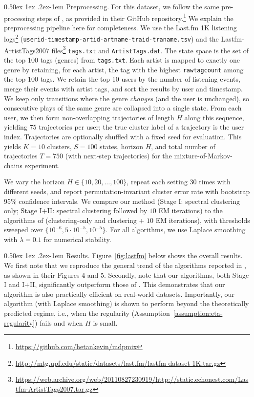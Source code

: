 \documentclass[twoside]{article}
\makeatletter
\renewcommand{\paragraph}{%
  \@startsection{paragraph}{4}%
  {\z@}{0.50ex \@plus 1ex \@minus .2ex}{-1em}%
  {\normalfont\normalsize\bfseries}%
}
\theoremstyle{plain}
\makeatother
\begin{document}
\paragraph{Preprocessing.}
For this dataset, we follow the same pre-processing steps of \citet{kausik2023mixture}, as provided in their GitHub repository.\footnote{\url{https://github.com/hetankevin/mdpmix}}
We explain the preprocessing pipeline here for completeness.
We use the Last.fm 1K listening logs\footnote{\url{http://mtg.upf.edu/static/datasets/last.fm/lastfm-dataset-1K.tar.gz}} (\texttt{userid-timestamp-artid-artname-traid-traname.tsv}) and the Lastfm-ArtistTags2007 files\footnote{\url{https://web.archive.org/web/20110827230919/http://static.echonest.com/Lastfm-ArtistTags2007.tar.gz}} \texttt{tags.txt} and \texttt{ArtistTags.dat}.
The state space is the set of the top 100 tags (genres) from \texttt{tags.txt}. 
Each artist is mapped to exactly one genre by retaining, for each artist, the tag with the highest \texttt{rawtagcount} among the top 100 tags.
We retain the top 10 users by the number of listening events, merge their events with artist tags, and sort the results by user and timestamp.
We keep only transitions where the genre \emph{changes} (and the user is unchanged), so consecutive plays of the same genre are collapsed into a single state.
From each user, we then form non-overlapping trajectories of length $H$ along this sequence, yielding $75$ trajectories per user; the true cluster label of a trajectory is the user index.
Trajectories are optionally shuffled with a fixed seed for evaluation.
This yields $K = 10$ clusters, $S = 100$ states, horizon $H$, and total number of trajectories $T = 750$ (with next-step trajectories) for the mixture-of-Markov-chains experiment.

We vary the horizon $H \in \{10, 20, \ldots, 100\}$, repeat each setting 30 times with different seeds, and report permutation-invariant cluster error rate with bootstrap 95\% confidence intervals.
We compare our method (Stage I: spectral clustering only; Stage I+II: spectral clustering followed by $10$ EM iterations) to the algorithms of \citet{kausik2023mixture} (clustering-only and clustering + $10$ EM iterations), with thresholds sweeped over $\{10^{-6}, 5 \cdot 10^{-5}, 10^{-5}\}$.
For all algorithms, we use Laplace smoothing with $\lambda = 0.1$ for numerical stability.

\paragraph{Results.}
Figure~\ref{fig:lastfm} below shows the overall results.
We first note that we reproduce the general trend of the algorithms reported in \citet{kausik2023mixture}, as shown in their Figures 4 and 5.
Secondly, note that our algorithms, both Stage I and I+II, significantly outperform those of \citet{kausik2023mixture}.
This demonstrates that our algorithm is also practically efficient on real-world datasets.
Importantly, our algorithm (with Laplace smoothing) is shown to perform beyond the theoretically predicted regime, i.e., when the regularity (Assumption~\ref{assumption:eta-regularity}) fails and when $H$ is small.
\end{document}
